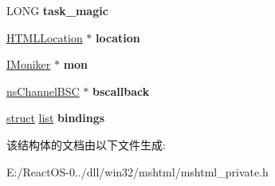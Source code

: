 \begin{DoxyCompactItemize}
L\+O\+NG {\bfseries task\+\_\+magic}
\item 
\mbox{\label{struct_h_t_m_l_inner_window_a0e36dc8232de5da4fa842ae4c968473c}} 
\hyperlink{struct_h_t_m_l_location}{H\+T\+M\+L\+Location} $\ast$ {\bfseries location}
\item 
\mbox{\label{struct_h_t_m_l_inner_window_a1e58c8b025d153cde41504ca02bfa7f2}} 
\hyperlink{interface_i_moniker}{I\+Moniker} $\ast$ {\bfseries mon}
\item 
\mbox{\label{struct_h_t_m_l_inner_window_abefb66e98fcd32f05195e6a52eac22a4}} 
\hyperlink{structns_channel_b_s_c}{ns\+Channel\+B\+SC} $\ast$ {\bfseries bscallback}
\item 
\mbox{\label{struct_h_t_m_l_inner_window_a5871235ccb78200d8ddb11a0cd3bbdb8}} 
\hyperlink{interfacestruct}{struct} \hyperlink{classlist}{list} {\bfseries bindings}
\end{DoxyCompactItemize}


该结构体的文档由以下文件生成\+:\begin{DoxyCompactItemize}
\item 
E\+:/\+React\+O\+S-\/0../dll/win32/mshtml/mshtml\+\_\+private.\+h\end{DoxyCompactItemize}
